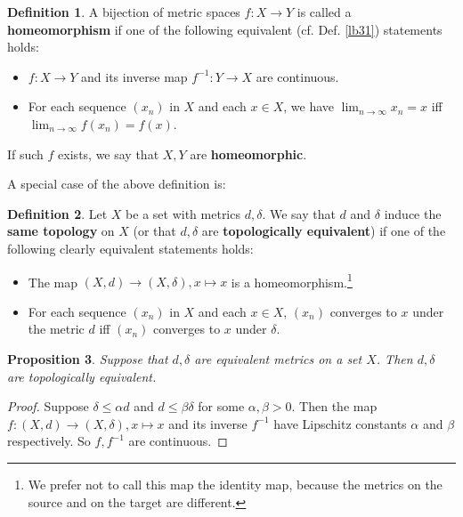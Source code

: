 \documentclass[12pt,b5paper,notitlepage]{article}
\theoremstyle{definition}
\newtheorem{df}{Definition}[section]
\theoremstyle{plain}
\newtheorem{pp}[df]{Proposition}
\newcommand{\dps}{\displaystyle}
\numberwithin{equation}{section}
\begin{document}
\begin{df}\label{lb189}
A bijection of metric spaces $f:X\rightarrow Y$ is called a \textbf{homeomorphism} if one of the following equivalent (cf. Def. \ref{lb31}) statements holds:
\begin{itemize}
\item[(1)] $f:X\rightarrow Y$ and its inverse map $f^{-1}:Y\rightarrow X$ are continuous.
\item[(2)] For each sequence $(x_n)$ in $X$ and each $x\in X$, we have $\dps \lim_{n\rightarrow\infty}x_n=x$ iff $\dps\lim_{n\rightarrow\infty}f(x_n)=f(x)$.
\end{itemize}
If such $f$ exists, we say that $X,Y$ are \textbf{homeomorphic}.
\end{df}

A special case of the above definition is:
\begin{df}\label{lb144}
Let $X$ be a set with metrics $d,\delta$. We say that $d$ and $\delta$ induce the \textbf{same topology} on $X$ (or that $d,\delta$ are  \textbf{topologically equivalent}) if one of the following clearly equivalent statements holds:
\begin{itemize}
\item[(1)] The map $(X,d)\rightarrow (X,\delta),x\mapsto x$ is a homeomorphism.\footnote{We prefer not to call this map the identity map, because the metrics on the source and on the target are different.}
\item[(2)] For each sequence $(x_n)$ in $X$ and each $x\in X$, $(x_n)$ converges to $x$ under the metric $d$ iff $(x_n)$ converges to $x$ under $\delta$.
\end{itemize}
\end{df}


\begin{pp}\label{lb48}
Suppose that $d,\delta$ are equivalent metrics on a set $X$. Then $d,\delta$ are topologically equivalent.
\end{pp}

\begin{proof}
Suppose $\delta\leq\alpha d$ and $d\leq\beta\delta$ for some $\alpha,\beta>0$. Then the map $f:(X,d)\rightarrow (X,\delta),x\mapsto x$ and its inverse $f^{-1}$ have Lipschitz constants $\alpha$ and $\beta$ respectively. So $f,f^{-1}$ are continuous.
\end{proof}
\end{document}
